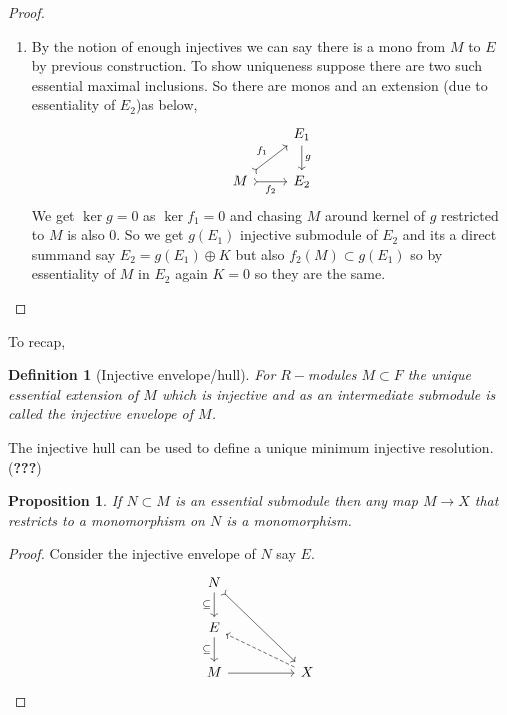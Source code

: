 \documentclass[12pt]{article}
\numberwithin{equation}{section}
\newtheorem{definition}{Definition}[section]
\newtheorem{proposition}{Proposition}[section]
\begin{document}
\begin{proof}
\begin{enumerate}
			
			Since $F$ is injective we may find a map $\beta: F/N \to F$ extending $\alpha.$ Since $\ker \beta \cap E = \ker \alpha =0$ and $E$ essential in $F/N$ we see even $\ker \beta =0$. So $\beta(F/N)$ essential extension of $E$ by maximality it means its equal to $E$ so $F/N=E$. So $E+N=F.$ And direct summand of injective is injective.
			\item By the notion of enough injectives we can say there is a mono from $M$ to $E$ by previous construction. To show uniqueness suppose there are two such essential maximal inclusions. So there are monos and an extension (due to essentiality of $E_2$)as below,
				\[\begin{tikzcd}
					& {E_1} \\
					M & {E_2}
					\arrow["{f_1}", tail, from=2-1, to=1-2]
					\arrow["{f_2}"', tail, from=2-1, to=2-2]
					\arrow["g", from=1-2, to=2-2]
				\end{tikzcd}\]
				We get $\ker g=0$ as $\ker f_1=0$ and chasing $M$ around kernel of $g$ restricted to $M$ is also 0. So we get $g(E_1) $ injective submodule of $E_2$ and its a direct summand say $E_2=g(E_1) \oplus K$ but also $f_2(M)\subset g(E_1)$ so by essentiality of $M$ in $E_2$ again $K=0$ so they are the same.
			
		\end{enumerate}
		
	
	\end{proof}
	To recap,
	\begin{definition}[Injective envelope/hull]
		For $R-$modules $M \subset F$ the unique essential extension of $M$	which is injective and as an intermediate submodule is called the injective envelope of $M$.
	\end{definition}
	The injective hull can be used to define a unique minimum injective resolution. (\textbf{???})
	\begin{proposition}
		If $N \subset M$ is an essential submodule then any map $M \to X$ that restricts to a monomorphism on $N$ is a monomorphism.
	\end{proposition}
	\begin{proof}
		Consider the injective envelope of $N$ say $E$.
		\[\begin{tikzcd}
			N \\
			E \\
			M && X
			\arrow["\subseteq"', from=1-1, to=2-1]
			\arrow["\subseteq"', from=2-1, to=3-1]
			\arrow[from=3-1, to=3-3]
			\arrow[tail, from=1-1, to=3-3]
			\arrow[dashed, from=3-3, to=2-1]
		\end{tikzcd}\]
	\end{proof}
\end{document}
